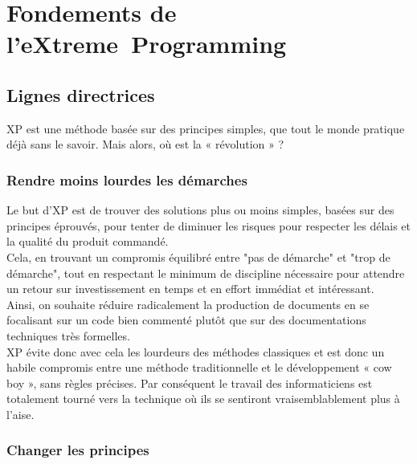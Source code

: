 \documentclass[]{article}
\begin{document}
\hypertarget{fondements-de-lextreme-programming}{%
\section{\texorpdfstring{\textbf{Fondements de
l'eXtreme~Programming}}{Fondements de l'eXtreme~Programming}}\label{fondements-de-lextreme-programming}}





\hypertarget{lignes-directrices}{%
\subsection{\texorpdfstring{\textbf{Lignes
directrices}}{Lignes directrices}}\label{lignes-directrices}}

XP est une méthode basée sur des principes simples, que tout le monde
pratique déjà sans le savoir. Mais alors, où est la « révolution » ?


\hypertarget{rendre-moins-lourdes-les-duxe9marches}{%
\subsubsection{Rendre moins lourdes les
démarches}\label{rendre-moins-lourdes-les-duxe9marches}}

Le but d'XP est de trouver des solutions plus ou moins simples, basées
sur des principes éprouvés, pour tenter de diminuer les risques pour
respecter les délais et la qualité du produit commandé.~\\
Cela, en trouvant un compromis équilibré entre "pas de démarche" et
"trop de démarche", tout en respectant le minimum de discipline
nécessaire pour attendre un retour sur investissement en temps et en
effort immédiat et intéressant.\\
Ainsi, on souhaite réduire radicalement la production de documents en se
focalisant sur un code bien commenté plutôt que sur des documentations
techniques très formelles.\\
XP évite donc avec cela les lourdeurs des méthodes classiques et est
donc un habile compromis entre une méthode traditionnelle et le
développement « cow boy », sans règles précises. Par conséquent le
travail des informaticiens est totalement tourné vers la technique où
ils se sentiront vraisemblablement plus à l'aise.


\hypertarget{changer-les-principes}{%
\subsubsection{Changer les principes}\label{changer-les-principes}}
\end{document}

